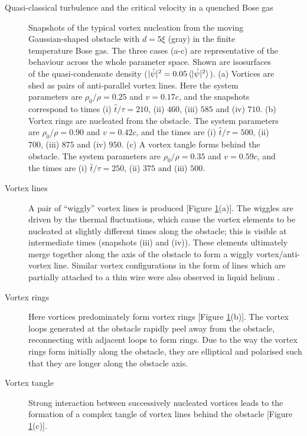 \begin{chapter}{\label{cha:nonequib}Quasi-classical turbulence and the critical velocity in a quenched Bose gas}
\begin{figure}
    \caption{\label{fig:vort-lines} Snapshots of the typical vortex nucleation from the moving Gaussian-shaped obstacle with $d=5\xi$ (gray) in the finite temperature Bose gas. The three cases (a-c) are representative of the behaviour across the whole parameter space. Shown are  isosurfaces of the quasi-condensate density ($|\hat{\psi}|^2 = 0.05\braket{|\hat{\psi}|^2}$).  (a) Vortices are shed as pairs of anti-parallel vortex lines.  Here the system parameters are $\rho_0/\rho = 0.25$ and $v=0.17c$, and the snapshots correspond to times (i) $\hat{t}/\tau=210$, (ii) $460$, (iii) $585$ and (iv) $710$.  (b) Vortex rings are nucleated from the obstacle.  The system parameters are $\rho_0/\rho = 0.90$ and $v=0.42c$, and the times are (i) $\hat{t}/\tau=500$, (ii) $700$, (iii) $875$ and (iv) $950$. (c) A vortex tangle forms behind the obstacle. The system parameters are $\rho_0/\rho = 0.35$ and $v=0.59c$, and the times are (i) $\hat{t}/\tau=250$, (ii) $375$ and (iii) $500$. }
\end{figure}


\begin{description}
\item[Vortex lines] A pair of ``wiggly'' vortex lines is produced  [Figure  \ref{fig:vort-lines}(a)].  The wiggles are driven by the thermal fluctuations, which cause the vortex elements to be nucleated at slightly different times along the obstacle; this is visible at intermediate times (snapshots (iii) and (iv)).   These elements ultimately merge together along the axis of the obstacle to form a wiggly vortex/anti-vortex line. Similar vortex configurations
in the form of lines which are partially attached to a thin wire 
were also observed in liquid helium \cite{zieve2001}. 
\item[Vortex rings]  Here vortices predominately form vortex
rings [Figure \ref{fig:vort-lines}(b)].  The vortex loops generated
at the obstacle rapidly peel away from the obstacle, reconnecting with
adjacent loops to form rings. Due to the way the vortex rings form initially along the obstacle, they are elliptical and polarised such that they are longer along the obstacle axis. 
\item[Vortex tangle]  Strong
interaction between successively nucleated vortices leads to the formation of a complex tangle of vortex lines behind the obstacle [Figure \ref{fig:vort-lines}(c)].
\end{description}


\end{chapter}
